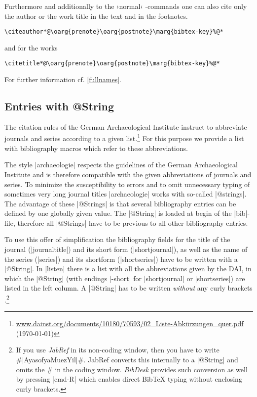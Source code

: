 \documentclass[a4paper,
10pt,
greek,
french,
spanish,
italian,
ngerman,
english
]{ltxdoc}
\begin{document}
\DescribeMacro{\citeauthor}\DescribeMacro{\citetitle}\label{citeauthor}%
Furthermore and additionally to the ›normal‹ -commands one can also cite only the author or the work title in the text and in the footnotes.
\begin{lstlisting}
\citeauthor*@\oarg{prenote}\oarg{postnote}\marg{bibtex-key}%@*
\end{lstlisting} 
  and for the works 
\begin{lstlisting}
\citetitle*@\oarg{prenote}\oarg{postnote}\marg{bibtex-key}%@*
\end{lstlisting} 
For further information cf. \cref{fullnames}.


\subsection{Entries with @String}\label{string}
The citation rules of the German Archaeological Institute instruct to abbreviate journals and series according to a given list.\footnote{\url{www.dainst.org/documents/10180/70593/02_Liste-Abkürzungen_quer.pdf}  (\today)}
For this purpose we provide a list with bibliography macros which refer to these abbreviations.

 The style |archaeologie| respects the guidelines of the German Archaeological Institute and is therefore compatible with the given abbreviations of journals and series.
To minimize the susceptibility to errors and to omit unnecessary typing of sometimes very long journal titles |archaeologie| works with so-called |@strings|.
The advantage of these |@Strings| is that several bibliography entries can be defined by one globally given value. 
The |@String| is loaded at begin of the |bib|-file, therefore all |@Strings| have to be previous to all other bibliography entries.
 
To use this offer of simplification the bibliography fields for the title of the journal (|journaltitle|) and its short form (|shortjournal|), as well as the name of the series (|series|) and its shortform  (|shortseries|) have to be written with a |@String|.
In \cref{listen} there is a list with all the abbreviations given by the DAI, in which the |@String| (with endings |-short| for |shortjournal| or |shortseries|) are listed in the left column.  
A |@String| has to be written \emph{without} any curly brackets .\footnote{If you use \emph{JabRef} in its non-coding window, then you have to write \#|AyasofyaMuezYil|\#. JabRef converts this internally to a |@String| and omits the \# in the coding window. \emph{BibDesk} provides such conversion as well by pressing |cmd-R| which enables direct BibTeX typing without enclosing curly brackets.}
\end{document}
